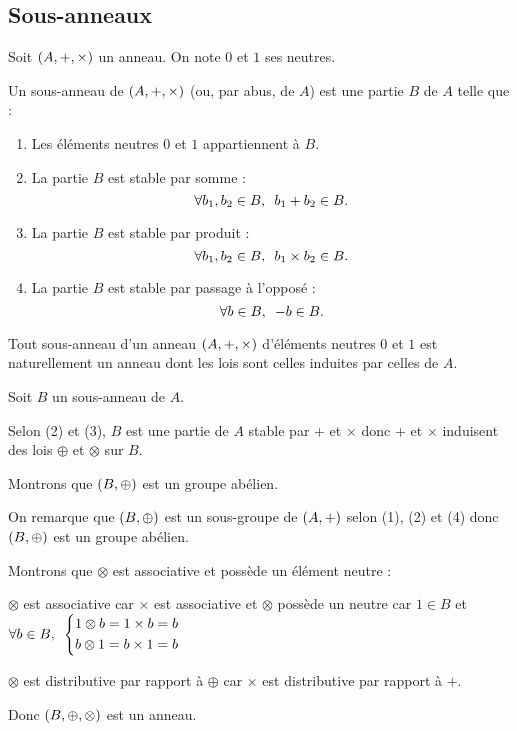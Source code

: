 \subsection{Sous-anneaux}

\begin{defi}
Soit \(\anneau{A}\) un anneau. On note \(0\) et \(1\) ses neutres.

Un sous-anneau de \(\anneau{A}\) (ou, par abus, de \(A\)) est une partie \(B\) de \(A\) telle que :

\begin{enumerate}[series=sousanneau]
\item Les éléments neutres \(0\) et \(1\) appartiennent à \(B\). \\

\item La partie \(B\) est stable par somme : \[\quantifs{\forall b_1,b_2\in B}b_1+b_2\in B.\]

\item La partie \(B\) est stable par produit : \[\quantifs{\forall b_1,b_2\in B}b_1\times b_2\in B.\]

\item La partie \(B\) est stable par passage à l'opposé : \[\quantifs{\forall b\in B}-b\in B.\]
\end{enumerate}
\end{defi}

\begin{prop}
Tout sous-anneau d'un anneau \(\anneau{A}\) d'éléments neutres \(0\) et \(1\) est naturellement un anneau dont les lois sont celles induites par celles de \(A\).
\end{prop}

\begin{dem}
Soit \(B\) un sous-anneau de \(A\).

Selon (2) et (3), \(B\) est une partie de \(A\) stable par \(+\) et \(\times\) donc \(+\) et \(\times\) induisent des lois \(\oplus\) et \(\otimes\) sur \(B\).

Montrons que \(\groupe{B}[\oplus]\) est un groupe abélien.

On remarque que \(\groupe{B}[\oplus]\) est un sous-groupe de \(\groupe{A}\) selon (1), (2) et (4) donc \(\groupe{B}[\oplus]\) est un groupe abélien.

Montrons que \(\otimes\) est associative et possède un élément neutre :

\(\otimes\) est associative car \(\times\) est associative et \(\otimes\) possède un neutre car \(1\in B\) et \(\quantifs{\forall b\in B}\begin{dcases}1\otimes b=1\times b=b \\ b\otimes1=b\times1=b\end{dcases}\)

\(\otimes\) est distributive par rapport à \(\oplus\) car \(\times\) est distributive par rapport à \(+\).

Donc \(\anneau{B}[\oplus][\otimes]\) est un anneau.
\end{dem}

